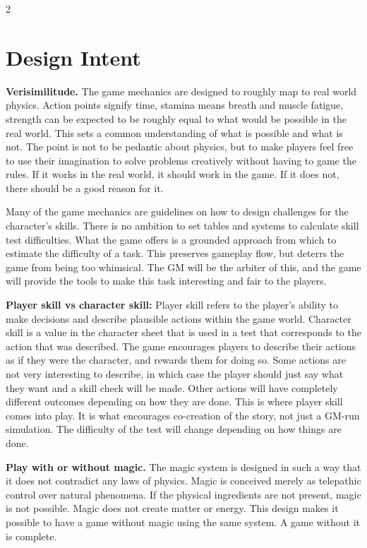 \begin{multicols}{2}
\section{Design Intent}

\textbf{Verisimilitude.} The game mechanics are designed to roughly map to real world physics. Action points signify time, stamina means breath and muscle fatigue, strength can be expected to be roughly equal to what would be possible in the real world. This sets a common understanding of what is possible and what is not. The point is not to be pedantic about physics, but to make players feel free to use their imagination to solve problems creatively without having to game the rules. If it works in the real world, it should work in the game. If it does not, there should be a good reason for it.

Many of the game mechanics are guidelines on how to design challenges for the character's skills. There is no ambition to set tables and systems to calculate skill test difficulties. What the game offers is a grounded approach from which to estimate the difficulty of a task. This preserves gameplay flow, but deterrs the game from being too whimsical. The GM will be the arbiter of this, and the game will provide the tools to make this task interesting and fair to the players.

\textbf{Player skill vs character skill:} Player skill refers to the player's ability to make decisions and describe plausible actions within the game world. Character skill is a value in the character sheet that is used in a test that corresponds to the action that was described. The game encourages players to describe their actions as if they were the character, and rewards them for doing so. Some actions are not very interesting to describe, in which case the player should just say what they want and a skill check will be made. Other actions will have completely different outcomes depending on how they are done. This is where player skill comes into play. It is what encourages co-creation of the story, not just a GM-run simulation. The difficulty of the test will change depending on how things are done.

\textbf{Play with or without magic.} The magic system is designed in such a way that it does not contradict any laws of physics. Magic is conceived merely as telepathic control over natural phenomena. If the physical ingredients are not present, magic is not possible. Magic does not create matter or energy. This design makes it possible to have a game without magic using the same system. A game without it is complete. 


\end{multicols}
